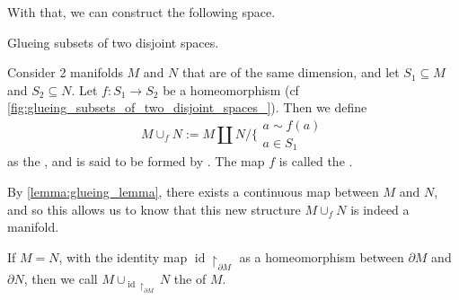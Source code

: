 \documentclass[notoc,notitlepage]{tufte-book}
\DeclareMathOperator{\id}{id}
\begin{document}
With that, we can construct the following space.

\begin{defn}\label{defn:adjunction_space}
  \begin{marginfigure}
    \centering
    \caption{Glueing subsets of two disjoint spaces.}\label{fig:glueing_subsets_of_two_disjoint_spaces_}
  \end{marginfigure}
  Consider 2 manifolds $M$ and $N$ that are of the same dimension, and let $S_1
  \subseteq M$ and $S_2 \subseteq N$. Let $f : S_1 \to S_2$ be a homeomorphism (cf
  \cref{fig:glueing_subsets_of_two_disjoint_spaces_}). Then we define
  \begin{equation*}
    M \cup_f N := M \coprod N \Big/ \Big\lbrace \substack{a \sim f(a) \\ a \in S_1}
  \end{equation*}
  as the , and is said to be formed by 
  . The map $f$ is called the .
\end{defn}

\begin{remark}
  By \cref{lemma:glueing_lemma}, there exists a continuous map between $M$ and $N$, and so this
  allows us to know that this new structure $M \cup_f N$ is indeed a manifold.
\end{remark}

\begin{defn}[Double]\label{defn:double}
  If $M = N$, with the identity map $\id \restriction_{\partial M}$ as a homeomorphism between
  $\partial M$ and $\partial N$, then we call $M \cup_{\id \restriction_{\partial M}} N$ the
   of $M$.
\end{defn}
\end{document}
